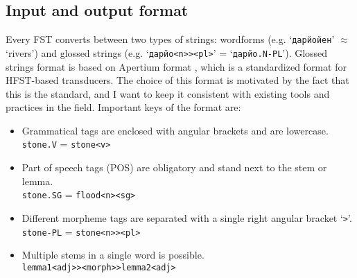 \subsection{Input and output format}
Every FST converts between two types of strings: wordforms (e.g. `\texttt{дарйойен}' $\approx$ `rivers') and glossed strings (e.g. `\texttt{дарйо<n>><pl>}' = `\texttt{дарйо.N-PL}'). Glossed strings format is based on Apertium format , which is a standardized format for HFST-based transducers. The choice of this format is motivated by the fact that this is the standard, and I want to keep it consistent with existing tools and practices in the field. Important keys of the format are:


\begin{itemize}
    \item Grammatical tags are enclosed with angular brackets and are lowercase.\\
    \texttt{stone.V} = \texttt{stone<v>}
    \item Part of speech tags (POS) are obligatory and stand next to the stem or lemma.\\
    \texttt{stone.SG} = \texttt{flood<n><sg>}
    \item Different morpheme tags are separated with a single right angular bracket `\texttt{>}'.\\
    \texttt{stone-PL} = \texttt{stone<n>><pl>}
    \item Multiple stems in a single word is possible.\\
    \texttt{lemma1<adj>><morph>>lemma2<adj>}
\end{itemize}

